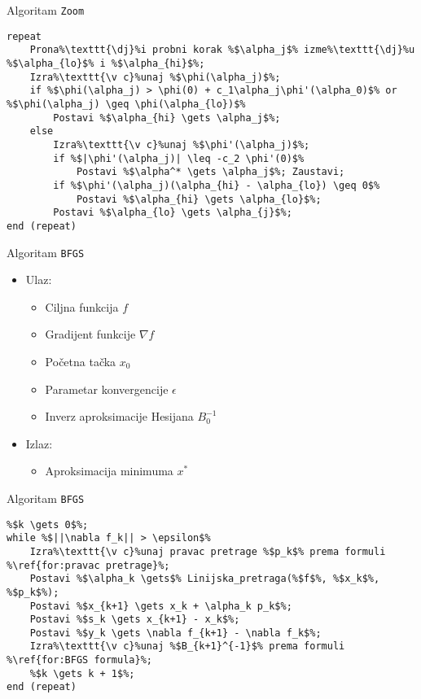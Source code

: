 \documentclass[serbian]{beamer}
\begin{document}
\begin{frame}[fragile]{Algoritam \texttt{Zoom}}

\begin{lstlisting}
repeat
	Prona%\texttt{\dj}%i probni korak %$\alpha_j$% izme%\texttt{\dj}%u %$\alpha_{lo}$% i %$\alpha_{hi}$%;
	Izra%\texttt{\v c}%unaj %$\phi(\alpha_j)$%;
	if %$\phi(\alpha_j) > \phi(0) + c_1\alpha_j\phi'(\alpha_0)$% or %$\phi(\alpha_j) \geq \phi(\alpha_{lo})$%
		Postavi %$\alpha_{hi} \gets \alpha_j$%;
	else
		Izra%\texttt{\v c}%unaj %$\phi'(\alpha_j)$%;
		if %$|\phi'(\alpha_j)| \leq -c_2 \phi'(0)$%
			Postavi %$\alpha^* \gets \alpha_j$%; Zaustavi;
		if %$\phi'(\alpha_j)(\alpha_{hi} - \alpha_{lo}) \geq 0$%
			Postavi %$\alpha_{hi} \gets \alpha_{lo}$%;
		Postavi %$\alpha_{lo} \gets \alpha_{j}$%;
end (repeat)
\end{lstlisting}

\end{frame}

\begin{frame}{Algoritam \texttt{BFGS}}

\begin{itemize}
	\item Ulaz: 
	\begin{itemize}
		\item Ciljna funkcija $f$ 
		\item Gradijent funkcije $\nabla f$
		\item Po\v cetna ta\v cka $x_0$
		\item Parametar konvergencije $\epsilon$
		\item Inverz aproksimacije Hesijana $B_0^{-1}$
	\end{itemize}
	\item Izlaz: 
	\begin{itemize}
		\item Aproksimacija minimuma $x^*$
	\end{itemize}
\end{itemize}

\end{frame}

\begin{frame}[fragile]{Algoritam \texttt{BFGS}}

\begin{lstlisting}
%$k \gets 0$%;
while %$||\nabla f_k|| > \epsilon$%
	Izra%\texttt{\v c}%unaj pravac pretrage %$p_k$% prema formuli %\ref{for:pravac pretrage}%;
	Postavi %$\alpha_k \gets$% Linijska_pretraga(%$f$%, %$x_k$%, %$p_k$%);
	Postavi %$x_{k+1} \gets x_k + \alpha_k p_k$%;
	Postavi %$s_k \gets x_{k+1} - x_k$%;
	Postavi %$y_k \gets \nabla f_{k+1} - \nabla f_k$%;
	Izra%\texttt{\v c}%unaj %$B_{k+1}^{-1}$% prema formuli %\ref{for:BFGS formula}%;
	%$k \gets k + 1$%;
end (repeat)
\end{lstlisting}

\end{frame}
\end{document}
